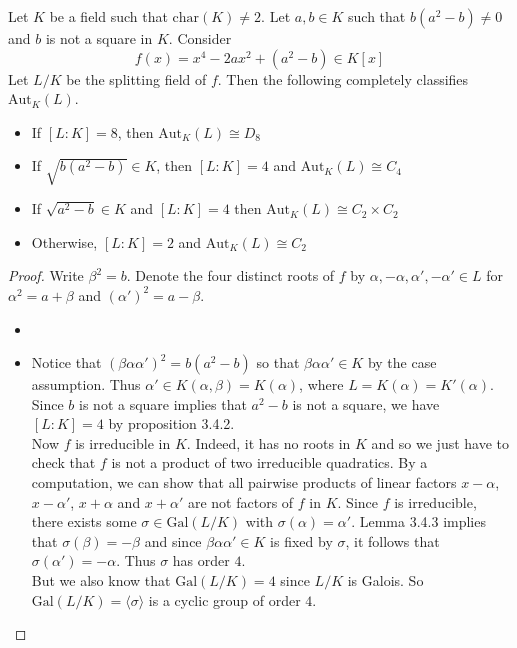 \documentclass[a4paper]{article}
\begin{document}
\begin{thm}{}{} Let $K$ be a field such that $\text{char}(K)\neq 2$. Let $a,b\in K$ such that $b(a^2-b)\neq 0$ and $b$ is not a square in $K$. Consider $$f(x)=x^4-2ax^2+(a^2-b)\in K[x]$$ Let $L/K$ be the splitting field of $f$. Then the following completely classifies $\text{Aut}_K(L)$. 
\begin{itemize}
\item If $[L:K]=8$, then $\text{Aut}_K(L)\cong D_8$
\item If $\sqrt{b(a^2-b)}\in K$, then $[L:K]=4$ and $\text{Aut}_K(L)\cong C_4$
\item If $\sqrt{a^2-b}\in K$ and $[L:K]=4$ then $\text{Aut}_K(L)\cong C_2\times C_2$
\item Otherwise, $[L:K]=2$ and $\text{Aut}_K(L)\cong C_2$
\end{itemize} 
\begin{proof}
Write $\beta^2=b$. Denote the four distinct roots of $f$ by $\alpha,-\alpha,\alpha',-\alpha'\in L$ for $\alpha^2=a+\beta$ and $(\alpha')^2=a-\beta$. 
\begin{itemize}
\item 
\item Notice that $(\beta\alpha\alpha')^2=b(a^2-b)$ so that $\beta\alpha\alpha'\in K$ by the case assumption. Thus $\alpha'\in K(\alpha,\beta)=K(\alpha)$, where $L=K(\alpha)=K'(\alpha)$. Since $b$ is not a square implies that $a^2-b$ is not a square, we have $[L:K]=4$ by proposition 3.4.2. \\

Now $f$ is irreducible in $K$. Indeed, it has no roots in $K$ and so we just have to check that $f$ is not a product of two irreducible quadratics. By a computation, we can show that all pairwise products of linear factors $x-\alpha$, $x-\alpha'$, $x+\alpha$ and $x+\alpha'$ are not factors of $f$ in $K$. Since $f$ is irreducible, there exists some $\sigma\in\text{Gal}(L/K)$ with $\sigma(\alpha)=\alpha'$. Lemma 3.4.3 implies that $\sigma(\beta)=-\beta$ and since $\beta\alpha\alpha'\in K$ is fixed by $\sigma$, it follows that $\sigma(\alpha')=-\alpha$. Thus $\sigma$ has order $4$. \\

But we also know that $\text{Gal}(L/K)=4$ since $L/K$ is Galois. So $\text{Gal}(L/K)=\langle\sigma\rangle$ is a cyclic group of order $4$. 


\end{itemize}
\end{proof}
\end{thm}
\end{document}
